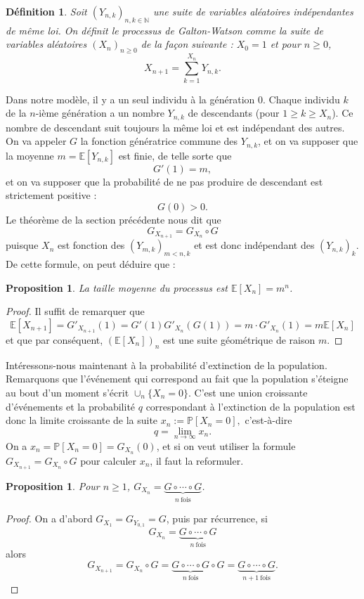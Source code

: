 \documentclass[a4paper,12pt]{book}
\newtheorem{defnfr}[thmfr]{Définition}
\newtheorem{propfr}[thmfr]{Proposition}
\begin{document}
\begin{defnfr}
Soit $(Y_{n,k})_{n,k\in \mathbb{N}}$ une suite de variables aléatoires indépendantes de même loi. On définit le processus de Galton-Watson comme la suite de variables aléatoires $(X_n)_{n\geq 0}$ de la façon suivante : $ X_0=1$ et pour $n\geq 0$,
$$X_{n+1}=\sum_{k=1}^{X_n}Y_{n,k}.$$
\end{defnfr}
Dans notre modèle, il y a un seul individu à la génération $0$. Chaque individu $k$ de la $n$-ième génération a un nombre $Y_{n,k}$ de descendants (pour $1\geq k \geq X_n$). Ce nombre de descendant suit toujours la même loi et est indépendant des autres. On va appeler $G$ la fonction génératrice commune des $Y_{n,k}$, et on va supposer que la moyenne $m=\mathbb{E}[Y_{n,k}]$ est finie, de telle sorte que
$$G'(1)=m,$$
et on va supposer que la probabilité de ne pas produire de descendant est strictement positive : $$G(0)>0.$$ Le théorème de la section précédente nous dit que
$$G_{X_{n+1}}=G_{X_n}\circ G $$
puisque $X_n$ est fonction des $(Y_{m,k})_{m<n,k}$ et est donc indépendant des $(Y_{n,k})_k$. De cette formule, on peut déduire que :
\begin{propfr}La taille moyenne du processus est $\mathbb{E}[X_n]=m^n$.
\end{propfr}
\begin{proof}Il suffit de remarquer que $$\mathbb{E}[X_{n+1}]=G'_{X_{n+1}}(1)=G'(1)G'_{X_n}(G(1))=m\cdot G'_{X_n}(1)=m\mathbb{E}[X_{n}]$$
et que par conséquent, $(\mathbb{E}[X_n])_n$ est une suite géométrique de raison $m$.
\end{proof}
Intéressons-nous maintenant à la probabilité d'extinction de la population. Remarquons que l’événement qui correspond au fait que la population s'éteigne au bout d'un moment s'écrit
$\cup_n\{X_n=0\}.$
C'est une union croissante d'événements et la probabilité $q$ correspondant à l'extinction de la population est donc la limite croissante de la suite $x_n:=\mathbb{P}[X_n=0],$ c'est-à-dire
$$q=\lim_{n\to \infty}x_n.$$
On a $x_n=\mathbb{P}[X_n=0]=G_{X_n}(0)$, et si on veut utiliser la formule
$G_{X_{n+1}}=G_{X_n}\circ G$ pour calculer $x_n$, il faut la reformuler.
\begin{propfr}Pour $n\geq 1$, $G_{X_n}=\underbrace{G\circ \cdots \circ G}_{n\ \text{fois}}$.
\end{propfr}
\begin{proof}On a d'abord $G_{X_1}=G_{Y_{0,1}}=G$, puis par récurrence, si
$$G_{X_n}=\underbrace{G\circ \cdots \circ G}_{n\ \text{fois}}$$
alors
$$G_{X_{n+1}}=G_{X_n}\circ G=\underbrace{G\circ \cdots \circ G}_{n\ \text{fois}}\circ G=\underbrace{G\circ \cdots \circ G}_{n+1\ \text{fois}}.$$
\end{proof}
\end{document}
